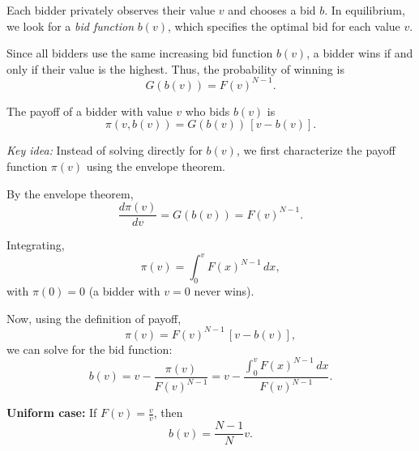\medskip

Each bidder privately observes their value $v$ and chooses a bid $b$.
In equilibrium, we look for a \textit{bid function} $b(v)$, which specifies
the optimal bid for each value $v$.

\medskip

Since all bidders use the same increasing bid function $b(v)$,
a bidder wins if and only if their value is the highest.
Thus, the probability of winning is
\[
G(b(v)) = F(v)^{N-1}.
\]

\medskip

The payoff of a bidder with value $v$ who bids $b(v)$ is
\[
\pi(v,b(v)) = G(b(v))\,[v - b(v)].
\]

\medskip

\textit{Key idea:} Instead of solving directly for $b(v)$,
we first characterize the payoff function $\pi(v)$ using
the envelope theorem.

\medskip

By the envelope theorem,
\[
\frac{d\pi(v)}{dv} = G(b(v)) = F(v)^{N-1}.
\]

\medskip

Integrating,
\[
\pi(v) = \int_0^v F(x)^{N-1}\,dx,
\]
with $\pi(0)=0$ (a bidder with $v=0$ never wins).

\medskip

Now, using the definition of payoff,
\[
\pi(v) = F(v)^{N-1}\,[v - b(v)],
\]
we can solve for the bid function:
\[
b(v) = v - \frac{\pi(v)}{F(v)^{N-1}}
= v - \frac{\int_0^v F(x)^{N-1}\,dx}{F(v)^{N-1}}.
\]

\medskip

\textbf{Uniform case:} If $F(v)=\frac{v}{\bar v}$, then
\[
b(v) = \frac{N-1}{N}v.
\]